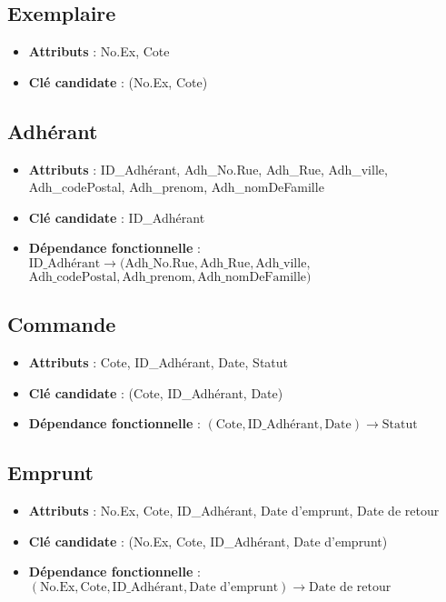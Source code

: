 \documentclass[12pt]{article}
\begin{document}
\subsection*{Exemplaire}
\begin{itemize}
    \item \textbf{Attributs} : No.Ex, Cote
    \item \textbf{Clé candidate} : (No.Ex, Cote)
\end{itemize}

\subsection*{Adhérant}
\begin{itemize}
    \item \textbf{Attributs} : ID\_Adhérant, Adh\_No.Rue, Adh\_Rue, Adh\_ville, Adh\_codePostal, Adh\_prenom, Adh\_nomDeFamille
    \item \textbf{Clé candidate} : ID\_Adhérant
    \item \textbf{Dépendance fonctionnelle} : \\
        \( \text{ID\_Adhérant} \rightarrow (\text{Adh\_No.Rue}, \text{Adh\_Rue}, \text{Adh\_ville},\)\\ \( \text{Adh\_codePostal}, \text{Adh\_prenom}, \text{Adh\_nomDeFamille}) \)
\end{itemize}

\subsection*{Commande}
\begin{itemize}
    \item \textbf{Attributs} : Cote, ID\_Adhérant, Date, Statut
    \item \textbf{Clé candidate} : (Cote, ID\_Adhérant, Date)
    \item \textbf{Dépendance fonctionnelle} : \( (\text{Cote}, \text{ID\_Adhérant}, \text{Date}) \rightarrow \text{Statut} \)
\end{itemize}

\subsection*{Emprunt}
\begin{itemize}
    \item \textbf{Attributs} : No.Ex, Cote, ID\_Adhérant, Date d’emprunt, Date de retour
    \item \textbf{Clé candidate} : (No.Ex, Cote, ID\_Adhérant, Date d’emprunt)
    \item \textbf{Dépendance fonctionnelle} : \( (\text{No.Ex}, \text{Cote}, \text{ID\_Adhérant}, \text{Date d’emprunt}) \rightarrow \text{Date de retour} \)
\end{itemize}
\end{document}
